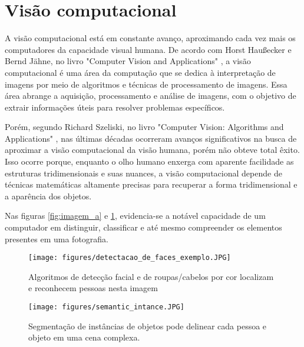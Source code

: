 \section{Visão computacional}

A visão computacional está em constante avanço, aproximando cada vez mais os computadores da capacidade visual humana. De acordo com Horst Haußecker e Bernd Jähne, no livro "Computer Vision and Applications" \cite{comp_vision_and_applications}, a visão computacional é uma área da computação que se dedica à interpretação de imagens por meio de algoritmos e técnicas de processamento de imagens. Essa área abrange a aquisição, processamento e análise de imagens, com o objetivo de extrair informações úteis para resolver problemas específicos.

Porém, segundo Richard Szeliski, no livro "Computer Vision: Algorithms and Applications" \cite{computer_vision_richard}, nas últimas décadas ocorreram avanços significativos na busca de aproximar a visão computacional da visão humana, porém não obteve total êxito. Isso ocorre porque, enquanto o olho humano enxerga com aparente facilidade as estruturas tridimensionais e suas nuances, a visão computacional depende de técnicas matemáticas altamente precisas para recuperar a forma tridimensional e a aparência dos objetos.

Nas figuras \cref{fig:imagem_a} e \cref{fig:imagem_b}, evidencia-se a notável capacidade de um computador em distinguir, classificar e até mesmo compreender os elementos presentes em uma fotografia.

\begin{figure}
    \centering
    \begin{minipage}[b]{0.49\textwidth}
      \centering
      \texttt{[image: figures/detectacao\_de\_faces\_exemplo.JPG]}
      \caption{Algoritmos de detecção facial e de roupas/cabelos por cor localizam e reconhecem pessoas nesta imagem \cite{computer_vision_richard}}
      \label{fig:imagem_a}
    \end{minipage}
    \hfill
    \begin{minipage}[b]{0.49\textwidth}
      \centering
      \texttt{[image: figures/semantic\_intance.JPG]}
        \caption{Segmentação de instâncias de objetos pode delinear cada pessoa e objeto em uma cena complexa. 
        \cite{instance_segmentation}}
      \label{fig:imagem_b}
    \end{minipage}
  \end{figure}


